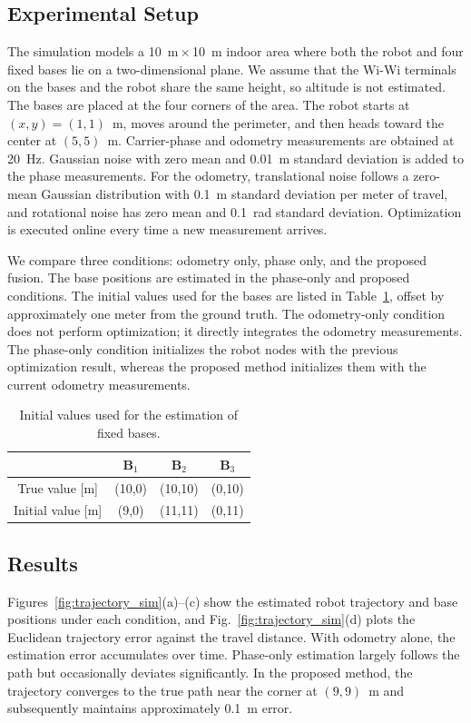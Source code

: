 \documentclass[conference]{IEEEtran}
\begin{document}
% 

\subsection{Experimental Setup}
The simulation models a 10~m\,$\times$\,10~m indoor area where both the robot and four fixed bases lie on a two-dimensional plane.
We assume that the Wi-Wi terminals on the bases and the robot share the same height, so altitude is not estimated.
The bases are placed at the four corners of the area.
The robot starts at $(x,y)=(1,1)$~m, moves around the perimeter, and then heads toward the center at $(5,5)$~m.
Carrier-phase and odometry measurements are obtained at 20~Hz.
Gaussian noise with zero mean and 0.01~m standard deviation is added to the phase measurements.
For the odometry, translational noise follows a zero-mean Gaussian distribution with 0.1~m standard deviation per meter of travel, and rotational noise has zero mean and 0.1~rad standard deviation.
Optimization is executed online every time a new measurement arrives.

We compare three conditions: odometry only, phase only, and the proposed fusion.
The base positions are estimated in the phase-only and proposed conditions.
The initial values used for the bases are listed in Table~\ref{tab:initial}, offset by approximately one meter from the ground truth.
The odometry-only condition does not perform optimization; it directly integrates the odometry measurements.
The phase-only condition initializes the robot nodes with the previous optimization result, whereas the proposed method initializes them with the current odometry measurements.

\begin{table}
    \centering
    \caption{Initial values used for the estimation of fixed bases.}
    \begin{tabular}{|c|c|c|c|}
    \hline
        & $\mathbf{B}_1$ & $\mathbf{B}_2$ & $\mathbf{B}_3$ \\ \hline
       True value [m] &(10,0)  &(10,10) &(0,10) \\ \hline
       Initial value [m] &(9,0)  &(11,11) &(0,11) \\ \hline
    \end{tabular}
    \label{tab:initial}
\end{table}

\subsection{Results}
Figures~\ref{fig:trajectory_sim}(a)--(c) show the estimated robot trajectory and base positions under each condition, and Fig.~\ref{fig:trajectory_sim}(d) plots the Euclidean trajectory error against the travel distance.
With odometry alone, the estimation error accumulates over time.
Phase-only estimation largely follows the path but occasionally deviates significantly.
In the proposed method, the trajectory converges to the true path near the corner at $(9,9)$~m and subsequently maintains approximately 0.1~m error.
\end{document}
